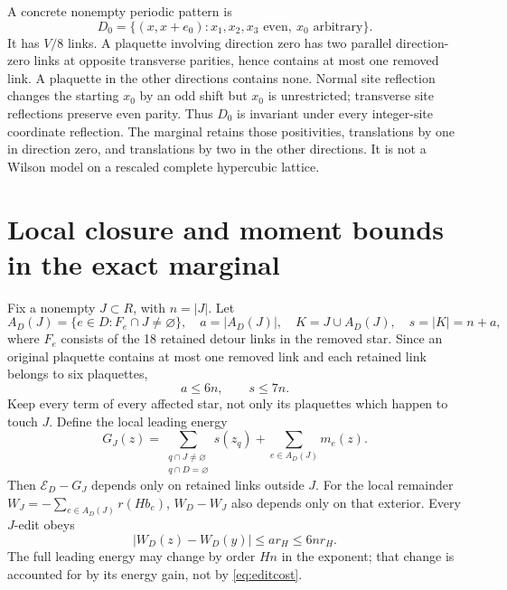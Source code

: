 \documentclass[11pt]{article}
\theoremstyle{definition}
\theoremstyle{remark}
\begin{document}
A concrete nonempty periodic pattern is
\begin{equation}
 D_0=\{(x,x+e_0):x_1,x_2,x_3\text{ even},\ x_0\text{ arbitrary}\}.
 \label{eq:pattern}
\end{equation}
It has $V/8$ links. A plaquette involving direction zero has two parallel
direction-zero links at opposite transverse parities, hence contains at
most one removed link. A plaquette in the other directions contains none. Normal site reflection changes the starting $x_0$ by an odd shift
but $x_0$ is unrestricted; transverse site reflections preserve even
parity. Thus $D_0$ is invariant under every integer-site coordinate
reflection. The marginal retains those positivities, translations by one
in direction zero, and translations by two in the other directions.
It is not a Wilson model on a rescaled complete hypercubic lattice.

\section{Local closure and moment bounds in the exact marginal}
Fix a nonempty $J\subset R$, with $n=|J|$. Let
\begin{equation}
 A_D(J)=\{e\in D:F_e\cap J\ne\varnothing\},\quad a=|A_D(J)|,\quad
 K=J\cup A_D(J),\quad s=|K|=n+a,
 \label{eq:closure}
\end{equation}
where $F_e$ consists of the 18 retained detour links in the removed star.
Since an original plaquette contains at most one removed link and each
retained link belongs to six plaquettes,
\begin{equation}
 a\le6n,\qquad s\le7n.
 \label{eq:closurebound}
\end{equation}
Keep every term of every affected star, not only its plaquettes which
happen to touch $J$. Define the local leading energy
\begin{equation}
 G_J(z)=\sum_{\substack{q\cap J\ne\varnothing\\q\cap D=\varnothing}}s(z_q)
                +\sum_{e\in A_D(J)}m_e(z).
 \label{eq:G}
\end{equation}
Then $\mathcal E_D-G_J$ depends only on retained links outside $J$.
For the local remainder $W_J=-\sum_{e\in A_D(J)}r(Hb_e)$, $W_D-W_J$
also depends only on that exterior. Every $J$-edit obeys
\begin{equation}
 |W_D(z)-W_D(y)|\le a r_H\le6nr_H.
 \label{eq:editcost}
\end{equation}
The full leading energy may change by order $Hn$ in the exponent; that
change is accounted for by its energy gain, not by \eqref{eq:editcost}.
\end{document}
